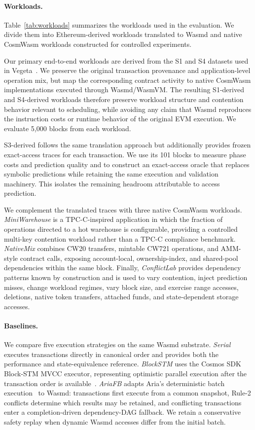 \paragraph{Workloads.}
Table~\ref{tab:workloads} summarizes the workloads used in the evaluation. We divide them into Ethereum-derived workloads translated to Wasmd and native CosmWasm workloads constructed for controlled experiments.

Our primary end-to-end workloads are derived from the S1 and S4 datasets used in Vegeta~\cite{xu2025vegeta}. We preserve the original transaction provenance and application-level operation mix, but map the corresponding contract activity to native CosmWasm implementations executed through Wasmd/WasmVM. The resulting S1-derived and S4-derived workloads therefore preserve workload structure and contention behavior relevant to scheduling, while avoiding any claim that Wasmd reproduces the instruction costs or runtime behavior of the original EVM execution. We evaluate 5,000 blocks from each workload.

S3-derived follows the same translation approach but additionally provides frozen exact-access traces for each transaction. We use its 101 blocks to measure phase costs and prediction quality and to construct an exact-access oracle that replaces symbolic predictions while retaining the same execution and validation machinery. This isolates the remaining headroom attributable to access prediction.

We complement the translated traces with three native CosmWasm workloads. \emph{MiniWarehouse} is a TPC-C-inspired application in which the fraction of operations directed to a hot warehouse is configurable, providing a controlled multi-key contention workload rather than a TPC-C compliance benchmark. \emph{NativeMix} combines CW20 transfers, mintable CW721 operations, and AMM-style contract calls, exposing account-local, ownership-index, and shared-pool dependencies within the same block. Finally, \emph{ConflictLab} provides dependency patterns known by construction and is used to vary contention, inject prediction misses, change workload regimes, vary block size, and exercise range accesses, deletions, native token transfers, attached funds, and state-dependent storage accesses.

\paragraph{Baselines.}
We compare five execution strategies on the same Wasmd substrate. \emph{Serial} executes transactions directly in canonical order and provides both the performance and state-equivalence reference. \emph{BlockSTM} uses the Cosmos SDK Block-STM MVCC executor, representing optimistic parallel execution after the transaction order is available~\cite{gelashvili2023blockstm}. \emph{AriaFB} adapts Aria's deterministic batch execution~\cite{lu2020aria} to Wasmd: transactions first execute from a common snapshot, Rule-2 conflicts determine which results may be retained, and conflicting transactions enter a completion-driven dependency-DAG fallback. We retain a conservative safety replay when dynamic Wasmd accesses differ from the initial batch.

